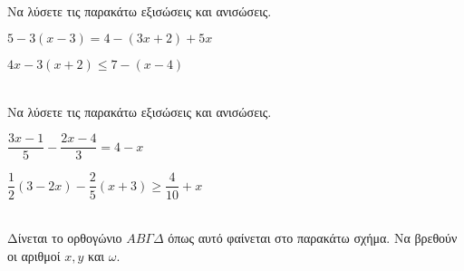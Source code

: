 \documentclass[ektypwsh]{diag-xelatex}
\begin{document}
\newpage
\noindent
\askhseis
\begin{thema}
\item \mbox{}\\
Να λύσετε τις παρακάτω εξισώσεις και ανισώσεις.
\begin{rlist}
\item $ 5-3(x-3)=4-(3x+2)+5x $
\item $ 4x-3(x+2)\leq7-(x-4) $
\end{rlist}
\item \mbox{}\\
Να λύσετε τις παρακάτω εξισώσεις και ανισώσεις.
\begin{rlist}
\item $ \dfrac{3x-1}{5}-\dfrac{2x-4}{3}=4-x $
\item $ \dfrac{1}{2}(3-2x)-\dfrac{2}{5}(x+3)\geq\dfrac{4}{10}+x $
\end{rlist}
\item \mbox{}\\
Δίνεται το ορθογώνιο $ AB\varGamma\varDelta $ όπως αυτό φαίνεται στο παρακάτω σχήμα. Να βρεθούν οι αριθμοί $ x,y $ και $ \omega $.
\begin{center}
\end{center}
\end{thema}
\end{document}
